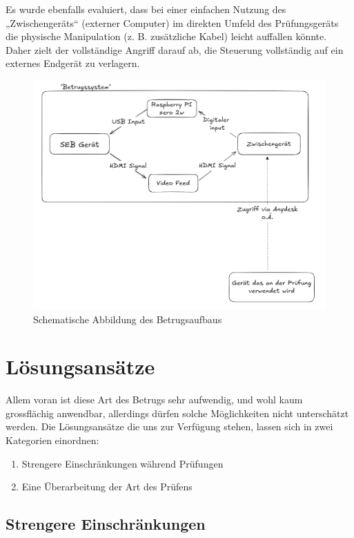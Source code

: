 \documentclass[14pt]{article}
\begin{document}
Es wurde ebenfalls evaluiert, dass bei einer einfachen Nutzung des „Zwischengeräts“ (externer Computer) im direkten Umfeld des Prüfungsgeräts die physische Manipulation (z. B. zusätzliche Kabel) leicht auffallen könnte. Daher zielt der vollständige Angriff darauf ab, die Steuerung vollständig auf ein externes Endgerät zu verlagern. 

\begin{figure}[h!]
	
	\includegraphics[width=\linewidth]{./images/schematic1.png}
	\caption{Schematische Abbildung des Betrugsaufbaus}

\end{figure}


\newpage
\section{Lösungsansätze}

Allem voran ist diese Art des Betrugs sehr aufwendig, und wohl kaum grossflächig anwendbar, allerdings dürfen solche Möglichkeiten nicht unterschätzt werden. Die Lösungsansätze die uns zur Verfügung stehen, lassen sich in zwei Kategorien einordnen: 

\begin{enumerate}
\item Strengere Einschränkungen während Prüfungen
\item Eine Überarbeitung der Art des Prüfens
\end{enumerate}

\subsection{Strengere Einschränkungen}
\end{document}
